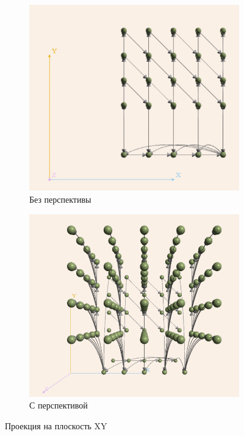 \documentclass[12pt, fleqn]{article}
\theoremstyle{definition}
\begin{document}
\begin{figure}[ht]
\begin{subfigure}{0.5\textwidth}
 \begin{center}
 \includegraphics[scale=0.78]{XY_proj.png}
 \caption{Без перспективы}
\end{center}
\end{subfigure}
\begin{subfigure}{0.49\textwidth}
 \begin{center}
 \includegraphics[scale=0.61]{XY_persp.png}
 \caption{С перспективой}
\end{center}
\end{subfigure}
\caption{Проекция на плоскость XY}
\label{fig:XY}
\end{figure}
\end{document}
